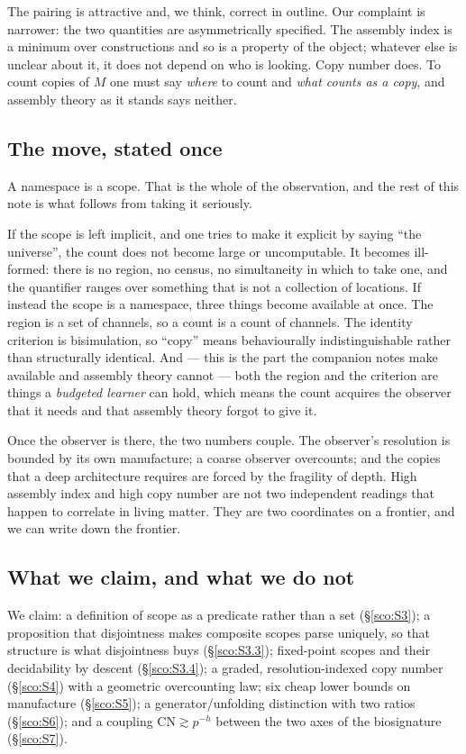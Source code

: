 \documentclass[11pt]{article}
\theoremstyle{plain}
\theoremstyle{definition}
\theoremstyle{remark}
\newcommand{\CN}{\mathrm{CN}}
\begin{document}
The pairing is attractive and, we think, correct in outline. Our
complaint is narrower: the two quantities are asymmetrically specified.
The assembly index is a minimum over constructions and so is a property of
the object; whatever else is unclear about it, it does not depend on who
is looking. Copy number does. To count copies of $M$ one must say
\emph{where} to count and \emph{what counts as a copy}, and assembly
theory as it stands says neither.

\subsection{The move, stated once}\label{sco:S1.2}

A namespace is a scope. That is the whole of the observation, and the rest
of this note is what follows from taking it seriously.

If the scope is left implicit, and one tries to make it explicit by
saying ``the universe'', the count does not become large or uncomputable.
It becomes ill-formed: there is no region, no census, no simultaneity in
which to take one, and the quantifier ranges over something that is not a
collection of locations. If instead the scope is a namespace, three things
become available at once. The region is a set of channels, so a count is a
count of channels. The identity criterion is bisimulation, so ``copy''
means behaviourally indistinguishable rather than structurally identical.
And --- this is the part the companion notes make available and assembly
theory cannot --- both the region and the criterion are things a
\emph{budgeted learner} can hold, which means the count acquires the
observer that it needs and that assembly theory forgot to give it.

Once the observer is there, the two numbers couple. The observer's
resolution is bounded by its own manufacture; a coarse observer
overcounts; and the copies that a deep architecture requires are forced by
the fragility of depth. High assembly index and high copy number are not
two independent readings that happen to correlate in living matter. They
are two coordinates on a frontier, and we can write down the frontier.

\subsection{What we claim, and what we do not}\label{sco:S1.3}

We claim: a definition of scope as a predicate rather than a set
(\S\ref{sco:S3}); a proposition that disjointness makes composite scopes
parse uniquely, so that structure is what disjointness buys
(\S\ref{sco:S3.3}); fixed-point scopes and their decidability by descent
(\S\ref{sco:S3.4}); a graded, resolution-indexed copy number
(\S\ref{sco:S4}) with a geometric overcounting law; six cheap lower bounds
on manufacture (\S\ref{sco:S5}); a generator/unfolding distinction with
two ratios (\S\ref{sco:S6}); and a coupling $\CN \gtrsim p^{-h}$ between
the two axes of the biosignature (\S\ref{sco:S7}).
\end{document}
